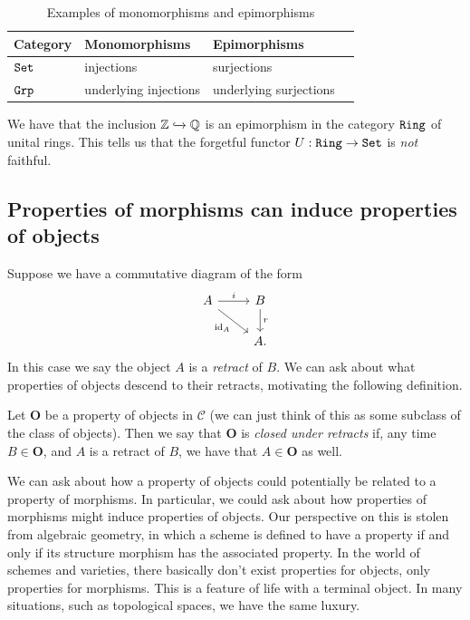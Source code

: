 \begin{table}[h]
    \centering
    \caption{Examples of monomorphisms and epimorphisms}
    \begin{tabular}{ p{2cm} l  p{5cm}  p{8cm} }
        \toprule
\textbf{Category}      
& \textbf{Monomorphisms}   
& \textbf{Epimorphisms} \\\midrule
$\texttt{Set}$ & injections & surjections \\\hline

$\texttt{Grp}$ & underlying injections & underlying surjections  \\\hline	 \bottomrule
    \end{tabular}
\end{table}


\begin{counterexample} We have that the inclusion $\mathbb{Z} \xhookrightarrow{} \mathbb{Q}$ is an epimorphism in the category $\texttt{Ring}$ of unital rings. This tells us that the forgetful functor $U: \texttt{Ring} \to \texttt{Set}$ is \textit{not} faithful.
\end{counterexample}

\subsection{Properties of morphisms can induce properties of objects}

Suppose we have a commutative diagram of the form
\[ \begin{tikzcd}
    A\rar["i" above]\ar[dr,"\id_A" below left] & B\dar["r" right]\\
     & A.
\end{tikzcd} \]
In this case we say the object $A$ is a \textit{retract} of $B$. We can ask about what properties of objects descend to their retracts, motivating the following definition.

\begin{definition}\label{def:property-objects-closed-under-retracts} Let \textbf{O} be a property of objects in $\mathscr{C}$ (we can just think of this as some subclass of the class of objects). Then we say that \textbf{O} is \textit{closed under retracts} if, any time $B \in \mathbf{O}$, and $A$ is a retract of $B$, we have that $A\in \mathbf{O}$ as well.
\end{definition}

We can ask about how a property of objects could potentially be related to a property of morphisms. In particular, we could ask about how properties of morphisms might induce properties of objects. Our perspective on this is stolen from algebraic geometry, in which a scheme is defined to have a property if and only if its structure morphism has the associated property. In the world of schemes and varieties, there basically don't exist properties for objects, only properties for morphisms. This is a feature of life with a terminal object. In many situations, such as topological spaces, we have the same luxury.

